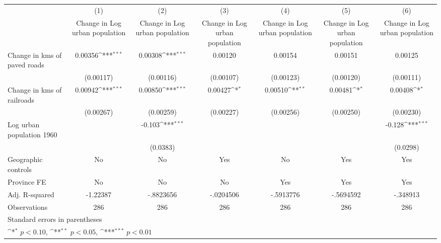 {
\def\sym#1{\ifmmode^{#1}\else\(^{#1}\)\fi}
\begin{tabular}{l*{6}{c}}
\hline\hline
                    &\multicolumn{1}{c}{(1)}&\multicolumn{1}{c}{(2)}&\multicolumn{1}{c}{(3)}&\multicolumn{1}{c}{(4)}&\multicolumn{1}{c}{(5)}&\multicolumn{1}{c}{(6)}\\
                    &\multicolumn{1}{c}{Change in Log urban population}&\multicolumn{1}{c}{Change in Log urban population}&\multicolumn{1}{c}{Change in Log urban population}&\multicolumn{1}{c}{Change in Log urban population}&\multicolumn{1}{c}{Change in Log urban population}&\multicolumn{1}{c}{Change in Log urban population}\\
\hline
Change in kms of paved roads&     0.00356\sym{***}&     0.00308\sym{***}&     0.00120         &     0.00154         &     0.00151         &     0.00125         \\
                    &   (0.00117)         &   (0.00116)         &   (0.00107)         &   (0.00123)         &   (0.00120)         &   (0.00111)         \\
[1em]
Change in kms of railroads&     0.00942\sym{***}&     0.00850\sym{***}&     0.00427\sym{*}  &     0.00510\sym{**} &     0.00481\sym{*}  &     0.00408\sym{*}  \\
                    &   (0.00267)         &   (0.00259)         &   (0.00227)         &   (0.00256)         &   (0.00250)         &   (0.00230)         \\
[1em]
Log urban population 1960&                     &      -0.103\sym{***}&                     &                     &                     &      -0.128\sym{***}\\
                    &                     &    (0.0383)         &                     &                     &                     &    (0.0298)         \\
\hline
Geographic controls &          No         &          No         &         Yes         &          No         &         Yes         &         Yes         \\
Province FE         &          No         &          No         &          No         &         Yes         &         Yes         &         Yes         \\
Adj. R-squared      &    -1.22387         &   -.8823656         &   -.0204506         &   -.5913776         &   -.5694592         &    -.348913         \\
Observations        &         286         &         286         &         286         &         286         &         286         &         286         \\
\hline\hline
\multicolumn{7}{l}{\footnotesize Standard errors in parentheses}\\
\multicolumn{7}{l}{\footnotesize \sym{*} \(p<0.10\), \sym{**} \(p<0.05\), \sym{***} \(p<0.01\)}\\
\end{tabular}
}
